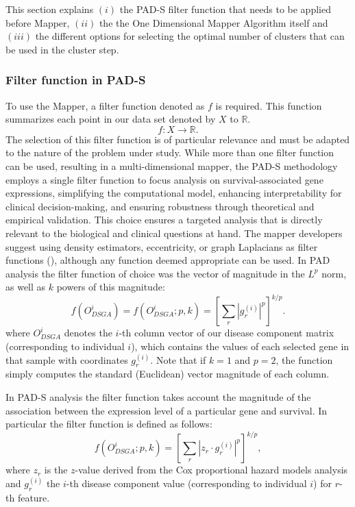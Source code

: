 This section explains \((i)\) the PAD-S filter function that needs to be applied before Mapper, \((ii)\) the the One Dimensional Mapper Algorithm itself and \((iii)\) the different options for selecting the optimal number of clusters that can be used in the cluster step.

\hypertarget{section2.3.1}{%
\subsubsection{Filter function in PAD-S}\label{section2.3.1}}

To use the Mapper, a filter function denoted as \(f\) is required. This function summarizes each point in our data set denoted by \(X\) to \(\mathbb{R}\). \[f: X \rightarrow \mathbb{R}.\] The selection of this filter function is of particular relevance and must be adapted to the nature of the problem under study. While more than one filter function can be used, resulting in a multi-dimensional mapper, the PAD-S methodology employs a single filter function to focus analysis on survival-associated gene expressions, simplifying the computational model, enhancing interpretability for clinical decision-making, and ensuring robustness through theoretical and empirical validation. This choice ensures a targeted analysis that is directly relevant to the biological and clinical questions at hand. The mapper developers suggest using density estimators, eccentricity, or graph Laplacians as filter functions (\citet{singh2007topological}), although any function deemed appropriate can be used. In PAD analysis the filter function of choice was the vector of magnitude in the \(L^p\) norm, as well as \(k\) powers of this magnitude:
\[f(O_{DSGA}^i) = f(O_{DSGA}^i;p,k) = \left[\sum_r |g_{r}^{(i)}|^p \right]^{k/p}.\]
where \(O_{DSGA}^i\) denotes the \(i\)-th column vector of our disease component matrix (corresponding to individual \(i\)), which contains the values of each selected gene in that sample with coordinates \(g_r^{(i)}.\) Note that if \(k = 1\) and \(p = 2\), the function simply computes the standard (Euclidean) vector magnitude of each column.

In PAD-S analysis the filter function takes account the magnitude of the association between the expression level of a particular gene and survival. In particular the filter function is defined as follows:
\[f(O_{DSGA}^i;p,k) = \left[\sum_r |z_{r}\cdot g_{r}^{(i)}|^p \right]^{k/p},\]
where \(z_{r}\) is the \(z\)-value derived from the Cox proportional hazard models analysis and \(g_r^{(i)}\) the \(i\)-th disease component value (corresponding to individual \(i\)) for \(r\)-th feature.

